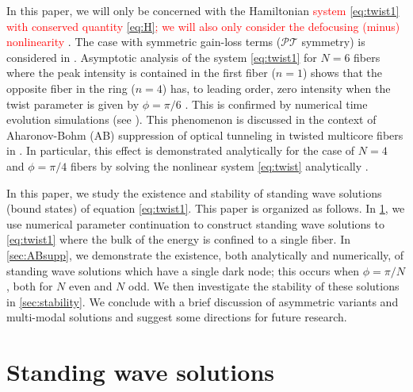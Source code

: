 \documentclass[reprint, amsmath,amssymb,aps,pra]{revtex4-2}
\renewcommand{\revised}[1]{ \textcolor{red}{#1} }
\begin{document}
In this paper, we will only be concerned with the Hamiltonian \revised{system \cref{eq:twist1} with conserved quantity \cref{eq:H}; we will also only consider the defocusing (minus) nonlinearity}. The case with symmetric gain-loss terms ($\mathcal{PT}$ symmetry) is considered in \cite{castro2016}. Asymptotic analysis of the system \cref{eq:twist1} for $N=6$ fibers where the peak intensity is contained in the first fiber ($n=1$) shows that the opposite fiber in the ring ($n=4$) has, to leading order, zero intensity when the twist parameter is given by $\phi = \pi/6$ \cite{castro2016}. This is confirmed by numerical time evolution simulations (see \cite[Figures 4 and 5]{castro2016}). This phenomenon is discussed in the context of Aharonov-Bohm (AB) suppression of optical tunneling in twisted multicore fibers in \cite{Parto2017,Parto2019}. In particular, this effect is demonstrated analytically for the case of $N = 4$ and $\phi = \pi/4$ fibers by solving the nonlinear system \cref{eq:twist} analytically \cite{Parto2019}. 

In this paper, we study the existence and stability of standing wave solutions (bound states) of equation \cref{eq:twist1}. This paper is organized as follows. In \cref{sec:standingwave}, we use numerical parameter continuation to construct standing wave solutions to \cref{eq:twist1} where the bulk of the energy is confined to a single fiber. In \cref{sec:ABsupp}, we demonstrate the existence, both analytically and numerically, of standing wave solutions which have a single dark node; this occurs when $\phi = \pi/N$, both for $N$ even and $N$ odd. We then investigate the stability of these solutions in \cref{sec:stability}. We conclude with a brief discussion of asymmetric variants and multi-modal solutions and suggest some directions for future research.

\section{Standing wave solutions}\label{sec:standingwave}
\end{document}
